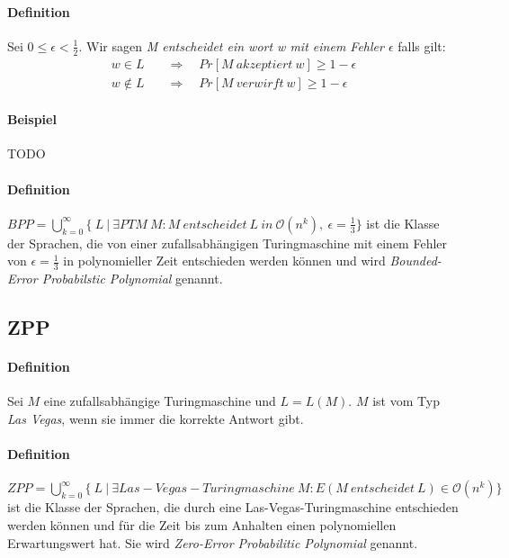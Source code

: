 \paragraph{Definition}
Sei $0 \leq \epsilon < \frac{1}{2}$. Wir sagen \emph{M entscheidet ein wort w mit einem Fehler $\epsilon$} falls gilt:
\begin{align*}
	w \in L \quad & \Rightarrow \quad Pr[M\ akzeptiert\ w] \geq 1 - \epsilon \\
	w \notin L \quad & \Rightarrow \quad Pr[M\ verwirft\ w] \geq 1 - \epsilon
\end{align*}

\paragraph{Beispiel}
TODO

\paragraph{Definition}
$BPP = \bigcup\limits_{k=0}^{\infty} \bigl\{\ L\ \bigl\lvert\ \exists PTM\ M : M\ entscheidet\ L\ in\ \mathcal{O}(n^k),\ \epsilon =  \frac{1}{3} \bigl\}$ ist die Klasse der Sprachen, die von einer zufallsabhängigen Turingmaschine mit einem Fehler von $\epsilon = \frac{1}{3}$ in polynomieller Zeit entschieden werden können und wird \emph{Bounded-Error Probabilstic Polynomial} genannt.


\subsection{ZPP}
\paragraph{Definition}
Sei $M$ eine zufallsabhängige Turingmaschine und $L = L(M)$. $M$ ist vom Typ \emph{Las Vegas}, wenn sie immer die korrekte Antwort gibt.

\paragraph{Definition}
$ZPP = \bigcup\limits_{k=0}^{\infty} \bigl\{\ L\ \bigl\lvert\ \exists Las-Vegas-Turingmaschine\ M : E(M\ entscheidet\ L) \in \mathcal{O}(n^k) \bigl\}$ ist die Klasse der Sprachen, die durch eine Las-Vegas-Turingmaschine entschieden werden können und für die Zeit bis zum Anhalten einen polynomiellen Erwartungswert hat. 
Sie wird \emph{Zero-Error Probabilitic Polynomial} genannt.



